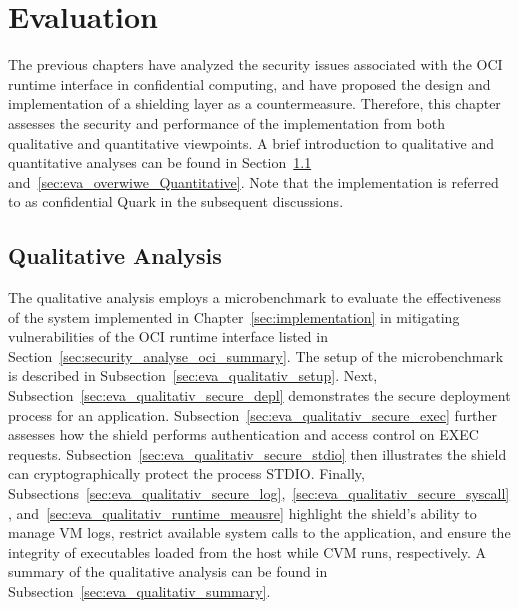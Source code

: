 \chapter{Evaluation}
\label{sec:evaluation}

The previous chapters have analyzed the security issues associated with the OCI runtime interface in confidential computing, and have proposed the design and implementation of a shielding layer as a countermeasure. Therefore, this chapter assesses the security and performance of the implementation 
from both qualitative and quantitative viewpoints. A brief introduction to qualitative and quantitative analyses can be found in Section~\ref{sec:eva_qualitativ} and~\ref{sec:eva_overwiwe_Quantitative}.
Note that the implementation is referred to as confidential Quark in the subsequent discussions.


\section{Qualitative Analysis}
\label{sec:eva_qualitativ}
The qualitative analysis employs a microbenchmark to evaluate the effectiveness of the system implemented in Chapter~\ref{sec:implementation} in mitigating vulnerabilities of the OCI runtime interface listed in Section~\ref{sec:security_analyse_oci_summary}. The setup of the 
microbenchmark is described in Subsection~\ref{sec:eva_qualitativ_setup}. Next, Subsection~\ref{sec:eva_qualitativ_secure_depl} demonstrates the secure deployment process for an application. Subsection~\ref{sec:eva_qualitativ_secure_exec} further assesses how the shield performs authentication and access control on EXEC requests.
Subsection~\ref{sec:eva_qualitativ_secure_stdio} then illustrates the shield can cryptographically protect the process STDIO. Finally, Subsections~\ref{sec:eva_qualitativ_secure_log},~\ref{sec:eva_qualitativ_secure_syscall}, and~\ref{sec:eva_qualitativ_runtime_meausre}
highlight the shield's ability to manage VM logs, restrict available system calls to the application, and ensure the integrity of executables loaded from the host while \acrshort{CVM} runs, respectively. A summary of the qualitative analysis can be found in Subsection~\ref{sec:eva_qualitativ_summary}.


